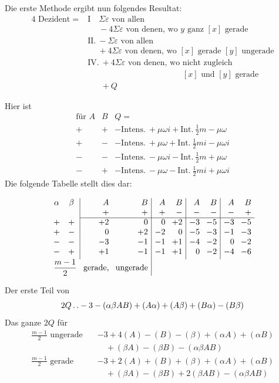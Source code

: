 Die erste Methode ergibt nun folgendes Resultat:
\[
\begin{aligned}
4\text{ Dezident}={}&\mathrm{I}\quad\Sigma\varepsilon\text{ von allen}\\
&\phantom{\mathrm{I}\quad}{-}4\Sigma\varepsilon\text{ von denen, wo }y\text{ ganz }[x]\text{ gerade}\\[3pt]
&\mathrm{II.}\ {-}\Sigma\varepsilon\text{ von allen}\\
&\phantom{\mathrm{II.}\ }{+}4\Sigma\varepsilon\text{ von denen, wo }[x]\text{ gerade }[y]\text{ ungerade}\\[3pt]
&\mathrm{IV.}\ {+}4\Sigma\varepsilon\text{ von denen, wo nicht zugleich}\\
&\phantom{\mathrm{IV.}\ {+}4\Sigma\varepsilon\text{ von denen, wo }}[x]\text{ und }[y]\text{ gerade}\\
&\phantom{\mathrm{IV.}\ }{+}Q
\end{aligned}
\]

Hier ist
\[
\begin{array}{cc|l}
\text{für }A&B&Q=\\
+&+&-\text{Intens.}\ {+}\mu\omega i+\text{Int.}\ \frac12m-\mu\omega\\
+&-&-\text{Intens.}\ {+}\mu\omega+\text{Int.}\ \frac12mi-\mu\omega i\\
-&-&-\text{Intens.}\ {-}\mu\omega i-\text{Int.}\ \frac12m+\mu\omega\\
-&+&-\text{Intens.}\ {-}\mu\omega-\text{Int.}\ \frac12mi+\mu\omega i
\end{array}
\]
Die folgende Tabelle stellt dies dar:

\[
\setlength{\arraycolsep}{4pt}
\begin{array}{cc|rr|rr|rr|rr}
\alpha&\beta& A&B&A&B&A&B&A&B\\
&&+&+&+&-&-&-&-&+\\ \cline{3-10}
+&+&+2&0&0&+2&-3&-5&-3&-5\\
+&-&0&+2&-2&0&-5&-3&-1&-3\\
-&-&-3&-1&-1&+1&-4&-2&0&-2\\
-&+&+1&-1&-1&+1&0&-2&-4&-6\\[3pt]
\multicolumn{2}{r}{\dfrac{m-1}{2}}&\text{gerade,}&\text{ungerade}&\multicolumn{6}{c}{}
\end{array}
\]

Der erste Teil von
\[
2Q\mathinner{.\,.} -3-(\alpha\beta AB)+(A\alpha)+(A\beta)+(B\alpha)-(B\beta)
\]
Das ganze $2Q$ für
\[
\begin{aligned}
\frac{m-1}{2}\text{ ungerade}\quad&-3+4(A)-(B)-(\beta)+(\alpha A)+(\alpha B)\\
&\quad +(\beta A)-(\beta B)-(\alpha\beta AB)\\[3pt]
\frac{m-1}{2}\text{ gerade}\quad&-3+2(A)+(B)+(\beta)+(\alpha A)+(\alpha B)\\
&\quad +(\beta A)-(\beta B)+2(\beta AB)-(\alpha\beta AB)
\end{aligned}
\]

